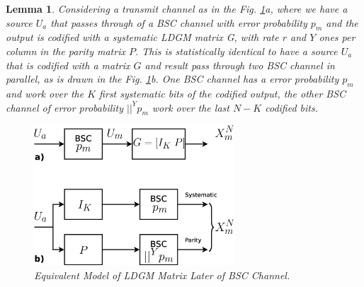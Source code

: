 \documentclass[journal]{IEEEtran}
\newtheorem{lemma}[theorem]{Lemma}
\begin{document}
\begin{lemma}
\label{lemma:equivbscldgm_}
Considering a transmit channel as in the 
Fig. \ref{fig:equiv_}a, where we have a source $U_a$ that passes through of a BSC 
channel with error probability $p_m$ and the output is codified with a systematic 
LDGM matrix G, with rate $r$ and $Y$ ones per column in the parity matrix $P$. 
This is statistically  identical to have a source $U_a$ that is codified with 
a matrix $G$ and result pass through two BSC channel in parallel, as is drawn 
in the Fig. \ref{fig:equiv_}b. One BSC channel has a error probability $p_m$ and
work over the $K$ first systematic bits of the codified output, the other BSC
channel of error probability $||^Y p_m$ work over the last $N-K$ codified bits.
\begin{figure}[h!bt]
\centering
\includegraphics[width=7.5cm]{equiv_.eps}
\caption{Equivalent Model of LDGM Matrix Later of BSC Channel.} \label{fig:equiv_}
\end{figure} 
\end{lemma}
\end{document}
